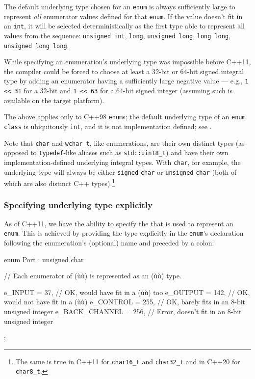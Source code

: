 \noindent The default underlying type chosen for an \lstinline!enum! is always
sufficiently large to represent \emph{all} enumerator values defined for
that \lstinline!enum!. If the value doesn't fit in an \lstinline!int!, it will
be selected deterministically as the first type able to represent all
values from the sequence: \lstinline!unsigned!~\lstinline!int!, \lstinline!long!,
\lstinline!unsigned!~\lstinline!long!, \lstinline!long!~\lstinline!long!,
\lstinline!unsigned!~\lstinline!long!~\lstinline!long!.

While specifying an enumeration’s underlying type was impossible before C++11, the compiler could be forced to choose at least a 32-bit or 64-bit signed integral type by adding an enumerator having a sufficiently large negative value --- e.g., \lstinline!1 << 31! for a 32-bit and \lstinline!1 << 63! for a 64-bit signed integer (assuming such is available on the target platform).

The above applies only to C++98 \lstinline!enum!s; the default underlying type of an \lstinline!enum! \lstinline!class! is ubiquitously \lstinline!int!, and it is not implementation defined; see .

Note that \lstinline!char! and \lstinline!wchar_t!, like enumerations, are their own distinct types (as opposed to \lstinline!typedef!-like aliases such as \lstinline!std::uint8_t!) and have their own implementation-defined underlying integral types. With \lstinline!char!, for example, the underlying type will always be either \lstinline!signed! \lstinline!char! or \lstinline!unsigned! \lstinline!char! (both of which are also distinct C++ types).{\cprotect\footnote{The same is true in C++11 for
\lstinline!char16_t! and \lstinline!char32_t! and in C++20 for
  \lstinline!char8_t!.}}

\subsubsection[Specifying underlying type explicitly]{Specifying underlying type explicitly}\label{specifying-underlying-type-explicitly}

As of C++11, we have the ability to specify the 
that is used to represent an \lstinline!enum!. This is achieved by
providing the type explicitly in the \lstinline!enum!'s declaration
following the enumeration's (optional) name and preceded by a colon:

\begin{emcppslisting}
enum Port : unsigned char
{
    // Each enumerator of (ù{}ù) is represented as an (ù{}ù) type.

    e_INPUT        =  37,  // OK, would have fit in a (ù{}ù) too
    e_OUTPUT       = 142,  // OK, would not have fit in a (ù{}ù)
    e_CONTROL      = 255,  // OK, barely fits in an 8-bit unsigned integer
    e_BACK_CHANNEL = 256,  // Error, doesn't fit in an 8-bit unsigned integer
};
\end{emcppslisting}

